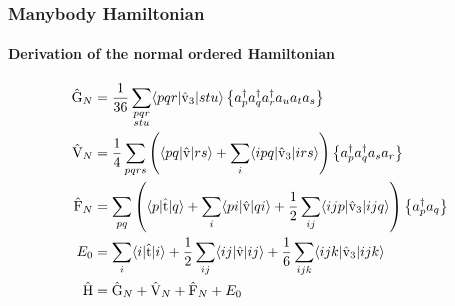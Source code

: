 \begin{frame}[fragile]
    \frametitle{Manybody Hamiltonian}
    \framesubtitle{Derivation of the normal ordered Hamiltonian}

    \begin{align}
        \hat{\mathrm{G}}_N &= \frac{1}{36} \sum_{\substack{
            pqr \\
            stu}} \langle pqr |\hat{\mathrm{v}}_3 |stu\rangle
            \left\{a^\dagger_p a^\dagger_q a^\dagger_r a_u a_t a_s\right\} \notag \\
        \hat{\mathrm{V}}_N &= \frac{1}{4} \sum_{pqrs} \left( \langle pq |\hat{\mathrm{v}}|rs\rangle 
        + \sum_{i} \langle ipq | \hat{\mathrm{v}}_3 |irs\rangle \right)
            \left\{a^\dagger_p a^\dagger_q a_s  a_r\right\} \notag \\
        \hat{\mathrm{F}}_N &= \sum_{pq} \left(  \langle p |\hat{\mathrm{t}}|q\rangle +
            \sum_{i} \langle pi |\hat{\mathrm{v}}|qi\rangle 
            + \frac{1}{2} \sum_{ij} \langle ijp | \hat{\mathrm{v}}_3 |ijq\rangle \right)
                \left\{a^\dagger_p a_q\right\} \notag \\
        E_0 &= \sum_i \langle i | \hat{\mathrm{t}} |i\rangle 
        + \frac{1}{2} \sum_{ij} \langle ij | \hat{\mathrm{v}} |ij\rangle
        + \frac{1}{6} \sum_{ijk} \langle ijk | \hat{\mathrm{v}}_3 |ijk\rangle \notag \\
        \hat{\mathrm{H}} &= \hat{\mathrm{G}}_N + \hat{\mathrm{V}}_N + \hat{\mathrm{F}}_N + E_0
    \end{align}

\end{frame}
